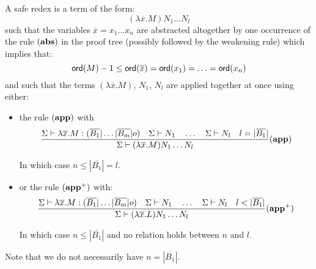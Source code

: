\begin{dfn}
A safe redex is a term of the form:
$$(\lambda \overline{x} . M) N_1 \ldots N_l$$
such that the variables $\overline{x}=x_1\ldots x_n$ are abstracted altogether by one occurrence
of the rule $\mathbf{(abs)}$ in the proof tree (possibly followed by the weakening rule)
which implies that:
$${\sf ord}(M) -1 \leq {\sf ord}(\overline{x}) = {\sf ord}(x_1) = \ldots = {\sf ord}(x_n)$$
and such that the terms $(\lambda \overline{x} . M)$, $N_1$, $N_l$ are applied together at
once using either:
\begin{itemize}
    \item the rule $\mathbf{(app)}$ with
        $$   \frac{\displaystyle 
                    \Sigma \vdash \lambda \overline{x} . M : (\overline{B_1}|\ldots|\overline{B_m}|o)
                    \quad
                    \Sigma \vdash N_1         \quad \ldots \quad \Sigma \vdash N_l
                    \quad l = |\overline{B_1}|
            }{
            \Sigma \vdash (\lambda \overline{x} . M) N_1 \ldots N_l
            } (\mathbf{app})
        $$

        In which case  $n\leq |\overline{B_1}| = l$.

\item or the rule $\mathbf{(app^+)}$ with:
        $$   \frac{\displaystyle 
                    \Sigma \vdash \lambda \overline{x} . M : (\overline{B_1}|\ldots|\overline{B_m}|o)
                    \quad
                    \Sigma \vdash N_1         \quad \ldots \quad \Sigma \vdash N_l
                    \quad l < |\overline{B_1}|
            }{
            \Sigma \vdash (\lambda \overline{x} . L) N_1 \ldots N_l
            } (\mathbf{app^+})
        $$

      In which case $n \leq |\overline{B_1}|$ and no relation holds between $n$ and $l$.
\end{itemize}
Note that we do not necessarily have $n = |\overline{B_1}|$.
\end{dfn}


